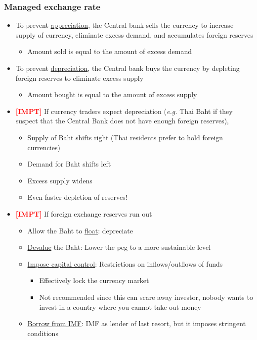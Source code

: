 \documentclass{article}
\newcommand{\eg}[0]{\textit{e.g. }}
\newcommand{\impt}[0]{\textcolor{red}{\textbf{[IMPT] }}}
\begin{document}
\begin{multicols}{2}
\subsubsection{Managed exchange rate}
\begin{itemize}
	\item To prevent \underline{appreciation}, the Central bank sells the currency to increase supply of currency, eliminate excess demand, and accumulates foreign reserves
	\begin{itemize}
		\item Amount sold is equal to the amount of excess demand
	\end{itemize}
	\item To prevent \underline{depreciation}, the Central bank buys the currency by depleting foreign reserves to eliminate excess supply
	\begin{itemize}
		\item Amount bought is equal to the amount of excess supply
	\end{itemize}
	\item \impt If currency traders expect depreciation (\eg Thai Baht if they suspect that the Central Bank does not have enough foreign reserves),
	\begin{itemize}
		\item Supply of Baht shifts right (Thai residents prefer to hold foreign currencies)
		\item Demand for Baht shifts left
		\item Excess supply widens
		\item Even faster depletion of reserves!
	\end{itemize}
    \item \impt If foreign exchange reserves run out
    \begin{itemize}
    	\item Allow the Baht to \underline{float}: depreciate
    	\item \underline{Devalue} the Baht: Lower the peg to a more sustainable level
    	\item \underline{Impose capital control}: Restrictions on inflows/outflows of funds
    	\begin{itemize}
    		\item Effectively lock the currency market
    		\item Not recommended since this can scare away investor, nobody wants to invest in a country where you cannot take out money
    	\end{itemize}
        \item \underline{Borrow from IMF}: IMF as lender of last resort, but it imposes stringent conditions
    \end{itemize}
\end{itemize}

\end{multicols}
\end{document}
